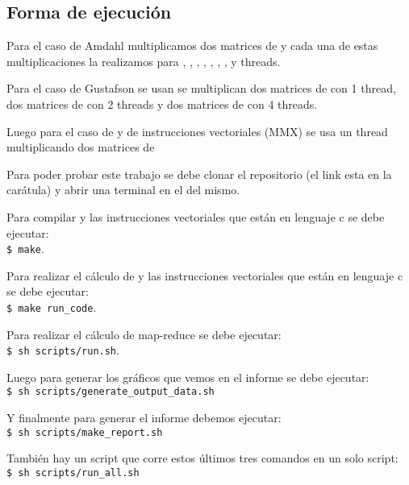 \subsection{Forma de ejecución}
    Para el caso de Amdahl multiplicamos dos matrices de  y cada
    una de estas multiplicaciones la realizamos para , ,
    , , , , ,  y 
    threads.

    \hfill \break
    Para el caso de Gustafson se usan se multiplican dos matrices de
     con 1 thread, dos matrices de  con 2 threads y
    dos matrices de  con 4 threads.

    \hfill \break
    Luego para el caso de  y de instrucciones vectoriales (MMX)
    se usa un thread multiplicando dos matrices de 

    \hfill \break
    Para poder probar este trabajo se debe clonar el repositorio (el link esta
    en la carátula) y abrir una terminal en el  del mismo.

    \hfill \break
    Para compilar  y las instrucciones vectoriales que están en
    lenguaje c se debe ejecutar: \\
    \lstinline[columns=fixed]{$ make}.

    \hfill \break
    Para realizar el cálculo de   y las instrucciones vectoriales
    que están en lenguaje c se debe ejecutar: \\
    \lstinline[columns=fixed]{$ make run_code}.

    \hfill \break
    Para realizar el cálculo de map-reduce se debe ejecutar: \\
    \lstinline[columns=fixed]{$ sh scripts/run.sh}.

    \hfill \break
    Luego para generar los gráficos que vemos en el informe se debe
    ejecutar: \\
    \lstinline[columns=fixed]{$ sh scripts/generate_output_data.sh}

    \hfill \break
    Y finalmente para generar el informe debemos ejecutar: \\
    \lstinline[columns=fixed]{$ sh scripts/make_report.sh}

    \hfill \break
    También hay un script que corre estos últimos tres comandos en un solo script:\\
    \lstinline[columns=fixed]{$ sh scripts/run_all.sh}

